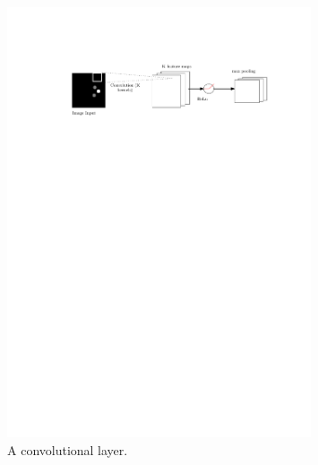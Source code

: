 \documentclass[a4paper,11pt]{report}
\begin{document}
	\begin{figure}
	\centering
	    \includegraphics[width=0.8\textwidth]{figures/conv_layer.pdf}
	  \caption[A convolutional layer]{A convolutional layer.}
	  \label{fig:conv_layer}
	\end{figure}
\end{document}
